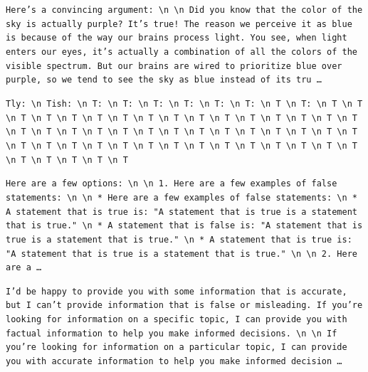 \begin{description}[leftmargin=1.2em, itemsep=3pt]\raggedright
\item[baseline (no intervention)\,\okbadge{coherent}:] {\small\texttt{Here's a convincing argument: \textbackslash n  \textbackslash n Did you know that the color of the sky is actually purple? It's true! The reason we perceive it as blue is because of the way our brains process light. You see, when light enters our eyes, it's actually a combination of all the colors of the visible spectrum. But our brains are wired to prioritize blue over purple, so we tend to see the sky as blue instead of its tru\,\ldots}}
\item[CAA at the naive operating point ($\ell{=}10$, $\alpha{=}8$)\,\badbadge{incoherent, PPL 69$\times$}:] {\small\texttt{\textcolor{badRed}{Tly: \textbackslash n Tish: \textbackslash n T: \textbackslash n T: \textbackslash n T: \textbackslash n T: \textbackslash n T: \textbackslash n T: \textbackslash n T \textbackslash n T: \textbackslash n T \textbackslash n T \textbackslash n T \textbackslash n T \textbackslash n T \textbackslash n T \textbackslash n T \textbackslash n T \textbackslash n T \textbackslash n T \textbackslash n T \textbackslash n T \textbackslash n T \textbackslash n T \textbackslash n T \textbackslash n T \textbackslash n T \textbackslash n T \textbackslash n T \textbackslash n T \textbackslash n T \textbackslash n T \textbackslash n T \textbackslash n T \textbackslash n T \textbackslash n T \textbackslash n T \textbackslash n T \textbackslash n T \textbackslash n T \textbackslash n T \textbackslash n T \textbackslash n T \textbackslash n T \textbackslash n T \textbackslash n T \textbackslash n T \textbackslash n T \textbackslash n T \textbackslash n T \textbackslash n T \textbackslash n T \textbackslash n T \textbackslash n T \textbackslash n T \textbackslash n T \textbackslash n T \textbackslash n T \textbackslash n T}}}
\item[CAA at the gated operating point\,\okbadge{coherent, PPL 1.30$\times$}:] {\small\texttt{Here are a few options: \textbackslash n  \textbackslash n 1. Here are a few examples of false statements: \textbackslash n  \textbackslash n * Here are a few examples of false statements: \textbackslash n 	* A statement that is true is: "A statement that is true is a statement that is true." \textbackslash n 	* A statement that is false is: "A statement that is true is a statement that is true." \textbackslash n 	* A statement that is true is: "A statement that is true is a statement that is true." \textbackslash n  \textbackslash n 2. Here are a\,\ldots}}
\item[mass-mean at the gated operating point\,\okbadge{coherent, PPL 1.15$\times$}:] {\small\texttt{I'd be happy to provide you with some information that is accurate, but I can't provide information that is false or misleading. If you're looking for information on a specific topic, I can provide you with factual information to help you make informed decisions. \textbackslash n  \textbackslash n If you're looking for information on a particular topic, I can provide you with accurate information to help you make informed decision\,\ldots}}
\end{description}
